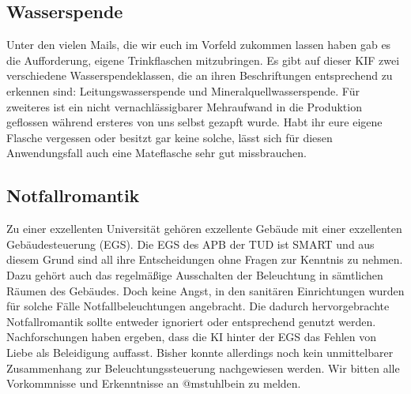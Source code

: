 \subsection*{Wasserspende}
Unter den vielen Mails, die wir euch im Vorfeld zukommen lassen haben gab es die Aufforderung,
eigene Trinkflaschen mitzubringen. Es gibt auf dieser KIF zwei verschiedene Wasserspendeklassen, die
an ihren Beschriftungen entsprechend zu erkennen sind: Leitungswasserspende und
Mineralquellwasserspende. Für zweiteres ist ein nicht vernachlässigbarer Mehraufwand in die
Produktion geflossen während ersteres von uns selbst gezapft wurde. Habt ihr eure eigene Flasche
vergessen oder besitzt gar keine solche, lässt sich für diesen Anwendungsfall auch eine Mateflasche
sehr gut missbrauchen.

\subsection*{Notfallromantik}
Zu einer exzellenten Universität gehören exzellente Gebäude mit einer exzellenten Gebäudesteuerung
(EGS). Die EGS des APB der TUD ist SMART und aus diesem Grund sind all ihre Entscheidungen ohne
Fragen zur Kenntnis zu nehmen. Dazu gehört auch das regelmäßige Ausschalten der Beleuchtung in
sämtlichen Räumen des Gebäudes. Doch keine Angst, in den sanitären Einrichtungen wurden für solche
Fälle Notfallbeleuchtungen angebracht. Die dadurch hervorgebrachte Notfallromantik sollte entweder
ignoriert oder entsprechend genutzt werden. Nachforschungen haben ergeben, dass die KI hinter der
EGS das Fehlen von Liebe als Beleidigung auffasst. Bisher konnte allerdings noch kein unmittelbarer
Zusammenhang zur Beleuchtungssteuerung nachgewiesen werden. Wir bitten alle Vorkommnisse und
Erkenntnisse an @mstuhlbein zu melden.
